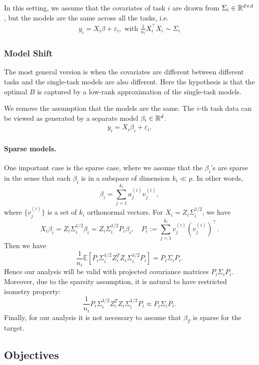In this setting, we assume that the covariates of task $i$ are drawn from $\Sigma_i \in \mathbb{R}^{d \times d}$, but the models are the same across all the tasks, i.e.
\begin{align}
	y_i = X_i \beta + \varepsilon_i, \mbox{ with } \frac 1 {n_i} X_i^{\top}X_i \sim \Sigma_i
\end{align}



\subsubsection{Model Shift}

The most general version is when the covariates are different between different tasks and the single-task models are also different.
Here the hypothesis is that the optimal $B$ is captured by a low-rank approximation of the single-task models.


We remove the assumption that the models are the same.
The $i$-th task data can be viewed as generated by a separate model $\beta_i\in\mathbb{R}^d$.
\begin{align}
	y_i = X_i \beta_i + \varepsilon_i.
\end{align}

\paragraph{Sparse models.}
One important case is the sparse case, where we assume that the $\beta_i$'s are sparse in the sense 
that each $\beta_i$ is in a subspace of dimension $k_i\ll p$. In other words,
$$\beta_i = \sum_{j=1}^{k_i} a^{(i)}_j v^{(i)}_j,$$
where $\{v^{(i)}_j\}$ is a set of $k_i$ orthonormal vectors. For $X_i= Z_i \Sigma_i^{1/2}$, we have 
$$ X_i \beta_i = Z_i \Sigma_i^{1/2}\beta_i=  Z_i \Sigma_i^{1/2}P_i\beta_i,\quad P_i:= \sum_{j=1}^{k_i}v_j^{(i)}(v_j^{(i)})^\top.$$
Then we have 
$$\frac{1}{n_i}\mathbb E\left[P_i \Sigma_i^{1/2} Z_i^T Z_i \Sigma_i^{1/2}P_i\right]=P_i \Sigma_i P_i.$$
Hence our analysis will be valid with projected covariance matrices $P_i \Sigma_i P_i$. Moreover, due to the sparsity assumption, it is natural to have restricted isometry property: 
$$\frac{1}{n_i} P_i \Sigma_i^{1/2} Z_i^T Z_i \Sigma_i^{1/2}P_i \approx P_i \Sigma_i P_i.$$
Finally, for our analysis it is not necessary to assume that $\beta_T$ is sparse for the target. 

\subsection{Objectives}


